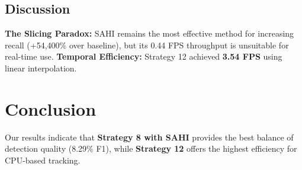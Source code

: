 \documentclass{article}
\begin{document}
\subsection{Discussion}
\textbf{The Slicing Paradox:} SAHI remains the most effective method for increasing
recall (+54,400\% over
baseline), but its 0.44 FPS throughput is unsuitable for real-time use. \textbf{Temporal
Efficiency:}
Strategy 12 achieved \textbf{3.54 FPS} using linear interpolation.

\section{Conclusion}
Our results indicate that \textbf{Strategy 8 with SAHI} provides the best balance of
detection quality
(8.29\% F1), while \textbf{Strategy 12} offers the highest efficiency for CPU-based tracking.



\end{document}
